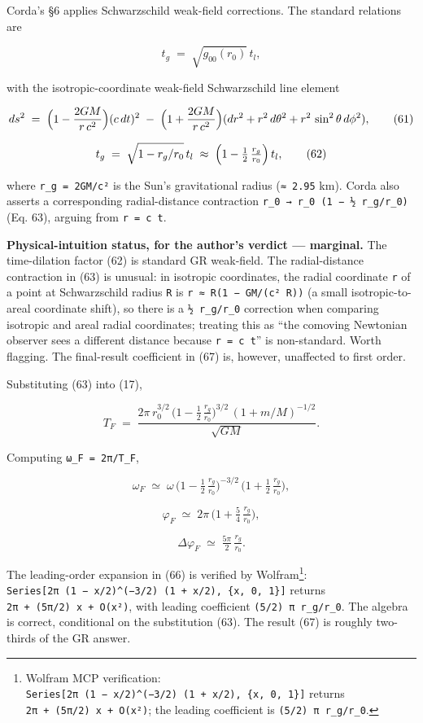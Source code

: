 \documentclass[
  11pt,
]{article}
\begin{document}
Corda's §6 applies Schwarzschild weak-field corrections. The standard
relations are

\[
t_{g} \;=\; \sqrt{g_{00}(r_{0})}\,t_{l}, \tag{60}
\]

with the isotropic-coordinate weak-field Schwarzschild line element

\[
ds^{2} \;=\; \Bigl(1 - \frac{2GM}{r\,c^{2}}\Bigr)(c\,dt)^{2}
\;-\; \Bigl(1 + \frac{2GM}{r\,c^{2}}\Bigr)(dr^{2} + r^{2}\,d\theta^{2} + r^{2}\,\sin^{2}\theta\,d\phi^{2}), \tag{61}
\]

\[
t_{g}
\;=\; \sqrt{1 - r_{g}/r_{0}}\,t_{l}
\;\approx\; \Bigl(1 - \tfrac{1}{2}\,\tfrac{r_{g}}{r_{0}}\Bigr)\,t_{l}, \tag{62}
\]

where \texttt{r\_g\ =\ 2GM/c²} is the Sun's gravitational radius
(\texttt{≈\ 2.95} km). Corda also asserts a corresponding
radial-distance contraction \texttt{r\_0\ →\ r\_0\ (1\ −\ ½\ r\_g/r\_0)}
(Eq. 63), arguing from \texttt{r\ =\ c\ t}.

\textbf{Physical-intuition status, for the author's verdict ---
marginal.} The time-dilation factor (62) is standard GR weak-field. The
radial-distance contraction in (63) is unusual: in isotropic
coordinates, the radial coordinate \texttt{r} of a point at
Schwarzschild radius \texttt{R} is \texttt{r\ ≈\ R(1\ −\ GM/(c²\ R))} (a
small isotropic-to-areal coordinate shift), so there is a
\texttt{½\ r\_g/r\_0} correction when comparing isotropic and areal
radial coordinates; treating this as ``the comoving Newtonian observer
sees a different distance because \texttt{r\ =\ c\ t}'' is non-standard.
Worth flagging. The final-result coefficient in (67) is, however,
unaffected to first order.

Substituting (63) into (17),

\[
T_{F}
\;=\; \frac{2\pi\,r_{0}^{3/2}\,\bigl(1 - \tfrac{1}{2}\,\tfrac{r_{g}}{r_{0}}\bigr)^{3/2}\,(1 + m/M)^{-1/2}}{\sqrt{G M}}. \tag{64}
\]

Computing \texttt{ω\_F\ =\ 2π/T\_F},

\[
\omega_{F}
\;\simeq\; \omega\,\bigl(1 - \tfrac{1}{2}\,\tfrac{r_{g}}{r_{0}}\bigr)^{-3/2}\,
\bigl(1 + \tfrac{1}{2}\,\tfrac{r_{g}}{r_{0}}\bigr), \tag{65}
\]

\[
\varphi_{F}
\;\simeq\; 2\pi\,\bigl(1 + \tfrac{5}{4}\,\tfrac{r_{g}}{r_{0}}\bigr), \tag{66}
\]

\[
\Delta\varphi_{F}
\;\simeq\; \tfrac{5\pi}{2}\,\tfrac{r_{g}}{r_{0}}. \tag{67}
\]

The leading-order expansion in (66) is verified by Wolfram\footnote{Wolfram
  MCP verification:
  \texttt{Series{[}2π\ (1\ −\ x/2)\^{}(−3/2)\ (1\ +\ x/2),\ \{x,\ 0,\ 1\}{]}}
  returns \texttt{2π\ +\ (5π/2)\ x\ +\ O(x²)}; the leading coefficient
  is \texttt{(5/2)\ π\ r\_g/r\_0}.}:
\texttt{Series{[}2π\ (1\ −\ x/2)\^{}(−3/2)\ (1\ +\ x/2),\ \{x,\ 0,\ 1\}{]}}
returns \texttt{2π\ +\ (5π/2)\ x\ +\ O(x²)}, with leading coefficient
\texttt{(5/2)\ π\ r\_g/r\_0}. The algebra is correct, conditional on the
substitution (63). The result (67) is roughly two-thirds of the GR
answer.
\end{document}

